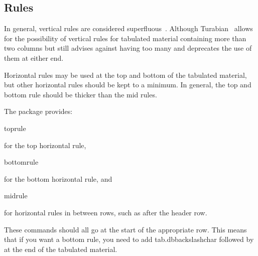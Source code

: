\subsection{Rules}
\label{sec:rules}

In general, vertical rules are considered superfluous~\cite{oxford}.
Although Turabian~\cite{turabian96} allows for the possibility of
vertical rules for tabulated material containing more than two
columns but still advises against having too many and deprecates
the use of them at either end.

Horizontal rules may be used at the top and bottom of the
tabulated material, but other horizontal rules should be kept to a
minimum. In general, the top and bottom rule should be thicker than
the mid rules.

The  package provides:
\begin{definition}
\gls{toprule}
\end{definition}
for the top horizontal rule,
\begin{definition}
\gls{bottomrule}
\end{definition}
for the bottom horizontal rule, and
\begin{definition}
\gls{midrule}
\end{definition}
for horizontal rules in between rows, such as after the header row.

These commands should all go at the start of the appropriate row.
This means that if you want a bottom rule, you need to add
\gls{tab.dbbackslashchar} followed by  at the end of
the tabulated material.

